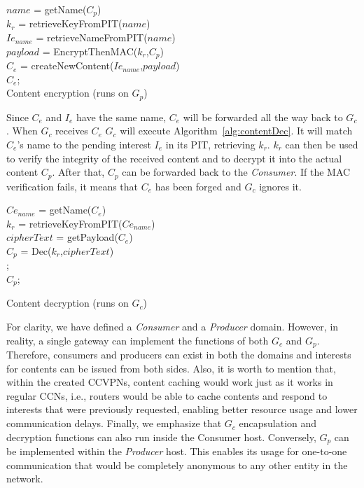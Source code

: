 \begin{algorithm}[]\label{alg:contentEnc}
$name$ = getName($C_p$)\\
$k_r$ = retrieveKeyFromPIT($name$)\\
$Ie_{name}$ = retrieveNameFromPIT($name$)\\
$payload$ = EncryptThenMAC($k_r$,$C_p$)\\
$C_e$ = createNewContent($Ie_{name}$,$payload$)\\
\Return $C_e$;\\
\caption{Content encryption  (runs on $G_p$)}
\end{algorithm}

Since $C_e$ and $I_e$ have the same name, $C_e$ will be forwarded all the way back to $G_c$. When $G_c$  receives $C_e$ $G_c$ will execute Algorithm~\ref{alg:contentDec}. It will match $C_e$'s name to the pending interest $I_e$ in its PIT, retrieving $k_r$. $k_r$ can then be used to verify the integrity of the received content and to decrypt it into the actual content $C_p$. After that, $C_p$ can be forwarded back to the \textit{Consumer}. If the MAC verification fails, it means that $C_e$ has been forged and $G_c$ ignores it.

\begin{algorithm}[]\label{alg:contentDec}
$Ce_{name}$ = getName($C_e$)\\
$k_r$ = retrieveKeyFromPIT($Ce_{name}$)\\
$cipherText$ = getPayload($C_e$)\\
$C_p$ = Dec($k_r$,$cipherText$)\\
    {
    \Return ;\\
    }
    {\Return $C_p$;\\}
\caption{Content decryption (runs on $G_c$)}
\end{algorithm}

For clarity, we have defined a \textit{Consumer} and a \textit{Producer} domain. However, in reality, a single gateway can implement the functions of both $G_c$ and $G_p$. Therefore, consumers and producers can exist in both the domains and interests for contents can be issued from both sides. Also, it is worth to mention that, within the created CCVPNs, content caching would work just as it works in regular CCNs,  i.e., routers would be able to cache contents and respond to interests that were previously requested, enabling better resource usage and lower communication delays. Finally, we emphasize that $G_c$ encapsulation and decryption functions can also run inside the Consumer host. Conversely, $G_p$ can be implemented within the \textit{Producer} host. This enables its usage for one-to-one communication that would be completely anonymous to any  other entity in the network.

